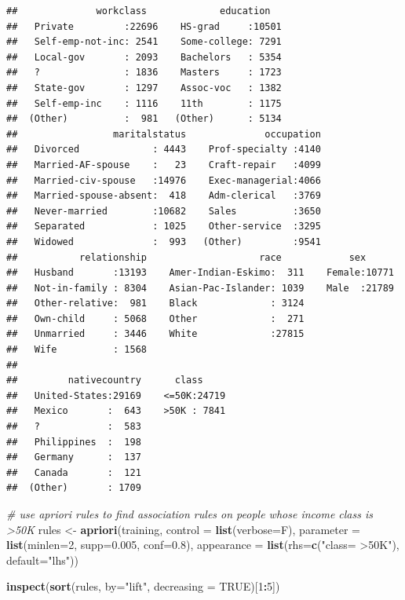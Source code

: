 \documentclass[]{article}
\newenvironment{Shaded}{\begin{snugshade}}{\end{snugshade}}
\newcommand{\KeywordTok}[1]{\textcolor[rgb]{0.13,0.29,0.53}{\textbf{#1}}}
\newcommand{\DataTypeTok}[1]{\textcolor[rgb]{0.13,0.29,0.53}{#1}}
\newcommand{\DecValTok}[1]{\textcolor[rgb]{0.00,0.00,0.81}{#1}}
\newcommand{\FloatTok}[1]{\textcolor[rgb]{0.00,0.00,0.81}{#1}}
\newcommand{\StringTok}[1]{\textcolor[rgb]{0.31,0.60,0.02}{#1}}
\newcommand{\CommentTok}[1]{\textcolor[rgb]{0.56,0.35,0.01}{\textit{#1}}}
\newcommand{\OtherTok}[1]{\textcolor[rgb]{0.56,0.35,0.01}{#1}}
\newcommand{\OperatorTok}[1]{\textcolor[rgb]{0.81,0.36,0.00}{\textbf{#1}}}
\newcommand{\NormalTok}[1]{#1}
\begin{document}
\begin{verbatim}
##              workclass             education    
##   Private         :22696    HS-grad     :10501  
##   Self-emp-not-inc: 2541    Some-college: 7291  
##   Local-gov       : 2093    Bachelors   : 5354  
##   ?               : 1836    Masters     : 1723  
##   State-gov       : 1297    Assoc-voc   : 1382  
##   Self-emp-inc    : 1116    11th        : 1175  
##  (Other)          :  981   (Other)      : 5134  
##                 maritalstatus              occupation  
##   Divorced             : 4443    Prof-specialty :4140  
##   Married-AF-spouse    :   23    Craft-repair   :4099  
##   Married-civ-spouse   :14976    Exec-managerial:4066  
##   Married-spouse-absent:  418    Adm-clerical   :3769  
##   Never-married        :10682    Sales          :3650  
##   Separated            : 1025    Other-service  :3295  
##   Widowed              :  993   (Other)         :9541  
##           relationship                    race            sex       
##   Husband       :13193    Amer-Indian-Eskimo:  311    Female:10771  
##   Not-in-family : 8304    Asian-Pac-Islander: 1039    Male  :21789  
##   Other-relative:  981    Black             : 3124                  
##   Own-child     : 5068    Other             :  271                  
##   Unmarried     : 3446    White             :27815                  
##   Wife          : 1568                                              
##                                                                     
##         nativecountry      class      
##   United-States:29169    <=50K:24719  
##   Mexico       :  643    >50K : 7841  
##   ?            :  583                 
##   Philippines  :  198                 
##   Germany      :  137                 
##   Canada       :  121                 
##  (Other)       : 1709
\end{verbatim}

\begin{Shaded}
\begin{Highlighting}[]
\CommentTok{# use apriori rules to find association rules on people whose income class is >50K }
\NormalTok{rules <-}\StringTok{ }\KeywordTok{apriori}\NormalTok{(training,}
                 \DataTypeTok{control =} \KeywordTok{list}\NormalTok{(}\DataTypeTok{verbose=}\NormalTok{F),}
                 \DataTypeTok{parameter =} \KeywordTok{list}\NormalTok{(}\DataTypeTok{minlen=}\DecValTok{2}\NormalTok{, }\DataTypeTok{supp=}\FloatTok{0.005}\NormalTok{, }\DataTypeTok{conf=}\FloatTok{0.8}\NormalTok{),}
                 \DataTypeTok{appearance =} \KeywordTok{list}\NormalTok{(}\DataTypeTok{rhs=}\KeywordTok{c}\NormalTok{(}\StringTok{"class= >50K"}\NormalTok{),}
                                   \DataTypeTok{default=}\StringTok{"lhs"}\NormalTok{))}

\KeywordTok{inspect}\NormalTok{(}\KeywordTok{sort}\NormalTok{(rules, }\DataTypeTok{by=}\StringTok{"lift"}\NormalTok{, }\DataTypeTok{decreasing =} \OtherTok{TRUE}\NormalTok{)[}\DecValTok{1}\OperatorTok{:}\DecValTok{5}\NormalTok{])}
\end{Highlighting}
\end{Shaded}
\end{document}
